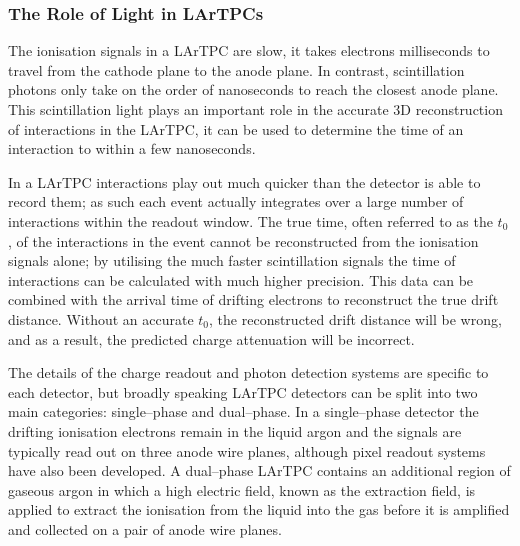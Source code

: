 \subsubsection*{The Role of Light in LArTPCs}

The ionisation signals in a LArTPC are slow, it takes electrons milliseconds to
travel from the cathode plane to the anode plane. In contrast, scintillation 
photons only take on the order of nanoseconds to reach the closest anode 
plane. This scintillation light plays an important role in the accurate 3D 
reconstruction of interactions in the LArTPC, it can be used to determine the
time of an interaction to within a few nanoseconds.

In a LArTPC interactions play out much quicker than the detector is able to 
record them; as such each event actually integrates over a large number of 
interactions within the readout window. The true time, often referred to as 
the $t_0$, of the interactions in the event cannot be reconstructed from the 
ionisation signals alone; by utilising the much faster scintillation signals 
the time of interactions can be calculated with much higher precision.  This 
data can be combined with the arrival time of drifting electrons to reconstruct 
the true drift distance. Without an accurate $t_0$, the reconstructed drift 
distance will be wrong, and as a result, the predicted charge attenuation
will be incorrect.

The details of the charge readout and photon detection systems are specific to 
each detector, but broadly speaking LArTPC detectors can be split into two 
main categories: single--phase and dual--phase. In a single--phase detector the
drifting ionisation electrons remain in the liquid argon and the signals are 
typically read out on three anode wire planes, although pixel readout systems
have also been developed\cite{argoncube}. A dual--phase LArTPC contains an
additional region of gaseous argon in which a high electric field, known as the
extraction field, is applied to extract the ionisation from the liquid into the
gas before it is amplified and collected on a pair of anode wire 
planes\cite{Abi:2020wmh}.

